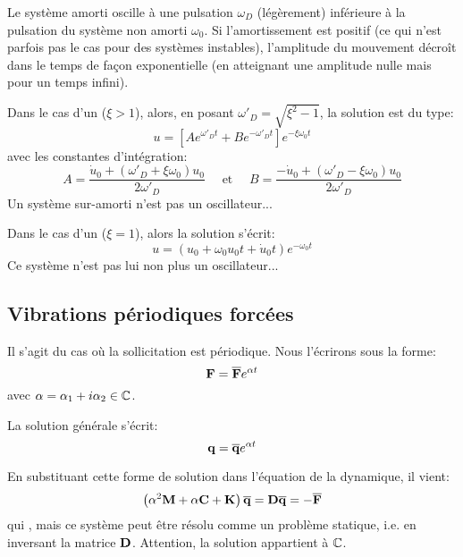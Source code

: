 Le système amorti oscille à une pulsation $\omega_D$ (légèrement) inférieure à la pulsation du
système non amorti $\omega_0$. Si l'amortissement est positif (ce qui n’est parfois pas le cas
pour des systèmes instables), l'amplitude du mouvement décroît dans le temps de façon
exponentielle (en atteignant une amplitude nulle mais pour un temps infini).

\medskip
Dans le cas d'un  ($\xi>1$), alors, en posant $\omega'_D=\sqrt{\xi^2-1}$, la solution est du type:
\begin{equation} u=\left[Ae^{\omega'_D t}+Be^{-\omega'_D t}\right] e^{-\xi\omega_0t} \end{equation}
avec les constantes d'intégration: 
\begin{equation}A=\dfrac{\dot{u}_0+(\omega'_D+\xi\omega_0)u_0}{2\omega'_D} \quad \text{ et }\quad
B=\dfrac{-\dot{u}_0+(\omega'_D-\xi\omega_0)u_0}{2\omega'_D} \end{equation}
Un système sur-amorti n'est pas un oscillateur...

\medskip
Dans le cas d'un  ($\xi=1$), alors la solution s'écrit:
\begin{equation}
u = (u_0+\omega_0u_0t+\dot{u}_0t)e^{-\omega_0 t}
\end{equation}
Ce système n'est pas lui non plus un oscillateur...




\medskip{}
\subsection{Vibrations périodiques forcées}

Il s'agit du cas où la sollicitation est périodique. Nous l'écrirons sous la forme:
\begin{equation} \mathbf{F}=\mathbf{\overline{F}}e^{\alpha t} \end{equation}
avec $\alpha=\alpha_1+i\alpha_2\in\mathbb C$.

La solution générale s'écrit:
\begin{equation} \mathbf{q}=\mathbf{\overline{q}}e^{\alpha t} \end{equation}

En substituant cette forme de solution dans l'équation de la dynamique, il vient:
\begin{equation} \left(\alpha^2\mathbf{M}+\alpha\mathbf{C}+\mathbf{K}\right)\mathbf{\overline{q}}=\mathbf{D}\mathbf{\overline{q}}=-\mathbf{\overline{F}} \end{equation}
qui , mais ce système peut être résolu
comme un problème statique, i.e. en inversant la matrice $\mathbf{D}$. Attention, la solution appartient à $\mathbb C$.

